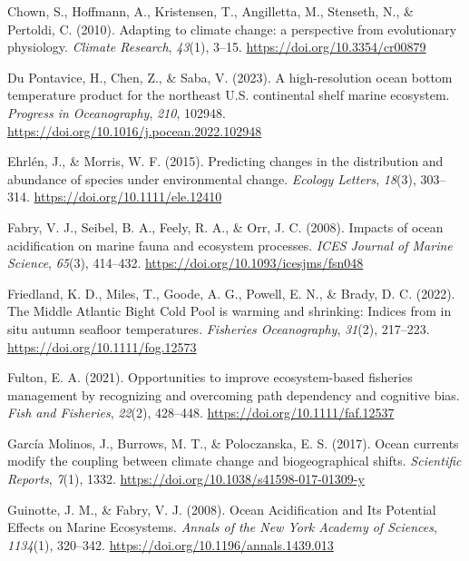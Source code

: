 \documentclass[
  12pt,
]{article}
\newlength{\cslhangindent}
\newenvironment{CSLReferences}[2] %
 {\begin{list}{}{%
  \setlength{\itemindent}{0pt}
  \setlength{\leftmargin}{0pt}
  \setlength{\parsep}{0pt}
  \ifodd #1
   \setlength{\leftmargin}{\cslhangindent}
   \setlength{\itemindent}{-1\cslhangindent}
  \fi
  \setlength{\itemsep}{#2\baselineskip}}}
 {\end{list}}
\begin{document}
\begin{CSLReferences}{1}{2}
Chown, S., Hoffmann, A., Kristensen, T., Angilletta, M., Stenseth, N., \& Pertoldi, C. (2010). Adapting to climate change: a perspective from evolutionary physiology. \emph{Climate Research}, \emph{43}(1), 3--15. \url{https://doi.org/10.3354/cr00879}

Du Pontavice, H., Chen, Z., \& Saba, V. (2023). A high-resolution ocean bottom temperature product for the northeast U.S. continental shelf marine ecosystem. \emph{Progress in Oceanography}, \emph{210}, 102948. \url{https://doi.org/10.1016/j.pocean.2022.102948}

Ehrlén, J., \& Morris, W. F. (2015). Predicting changes in the distribution and abundance of species under environmental change. \emph{Ecology Letters}, \emph{18}(3), 303--314. \url{https://doi.org/10.1111/ele.12410}

Fabry, V. J., Seibel, B. A., Feely, R. A., \& Orr, J. C. (2008). Impacts of ocean acidification on marine fauna and ecosystem processes. \emph{ICES Journal of Marine Science}, \emph{65}(3), 414--432. \url{https://doi.org/10.1093/icesjms/fsn048}

Friedland, K. D., Miles, T., Goode, A. G., Powell, E. N., \& Brady, D. C. (2022). The Middle Atlantic Bight Cold Pool is warming and shrinking: Indices from in situ autumn seafloor temperatures. \emph{Fisheries Oceanography}, \emph{31}(2), 217--223. \url{https://doi.org/10.1111/fog.12573}

Fulton, E. A. (2021). Opportunities to improve ecosystem{-}based fisheries management by recognizing and overcoming path dependency and cognitive bias. \emph{Fish and Fisheries}, \emph{22}(2), 428--448. \url{https://doi.org/10.1111/faf.12537}

García Molinos, J., Burrows, M. T., \& Poloczanska, E. S. (2017). Ocean currents modify the coupling between climate change and biogeographical shifts. \emph{Scientific Reports}, \emph{7}(1), 1332. \url{https://doi.org/10.1038/s41598-017-01309-y}

Guinotte, J. M., \& Fabry, V. J. (2008). Ocean Acidification and Its Potential Effects on Marine Ecosystems. \emph{Annals of the New York Academy of Sciences}, \emph{1134}(1), 320--342. \url{https://doi.org/10.1196/annals.1439.013}


\end{CSLReferences}
\end{document}
